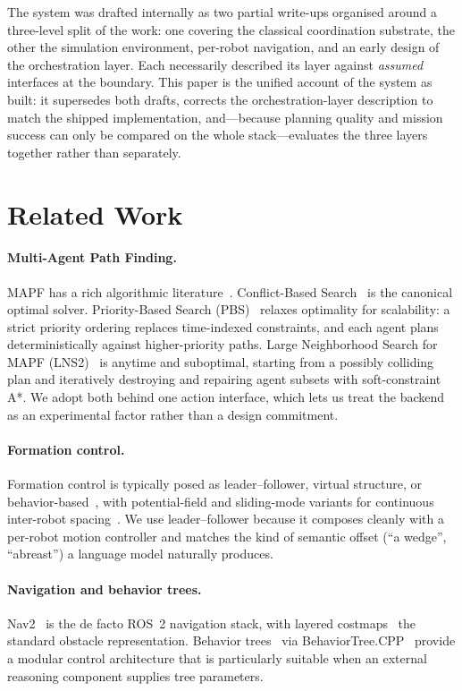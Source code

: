 \documentclass[10pt,twocolumn]{article}
\begin{document}
The system was drafted internally as two partial write-ups organised around a
three-level split of the work: one covering the classical coordination
substrate, the other the simulation environment, per-robot navigation, and an
early design of the orchestration layer. Each necessarily described its layer
against \emph{assumed} interfaces at the boundary. This paper is the unified
account of the system as built: it supersedes both drafts, corrects the
orchestration-layer description to match the shipped implementation,
and---because planning quality and mission success can only be compared on the
whole stack---evaluates the three layers together rather than separately.

\section{Related Work}

\paragraph{Multi-Agent Path Finding.}
MAPF has a rich algorithmic literature~\cite{stern}. Conflict-Based
Search~\cite{cbs} is the canonical optimal solver. Priority-Based Search
(PBS)~\cite{pbs} relaxes optimality for scalability: a strict priority ordering
replaces time-indexed constraints, and each agent plans deterministically
against higher-priority paths. Large Neighborhood Search for MAPF
(LNS2)~\cite{lns2} is anytime and suboptimal, starting from a possibly
colliding plan and iteratively destroying and repairing agent subsets with
soft-constraint A*. We adopt both behind one action interface, which lets us
treat the backend as an experimental factor rather than a design commitment.

\paragraph{Formation control.}
Formation control is typically posed as leader--follower, virtual structure, or
behavior-based~\cite{formsurvey1,formsurvey2}, with potential-field and
sliding-mode variants for continuous inter-robot spacing~\cite{apf}. We use
leader--follower because it composes cleanly with a per-robot motion controller
and matches the kind of semantic offset (``a wedge'', ``abreast'') a language
model naturally produces.

\paragraph{Navigation and behavior trees.}
Nav2~\cite{nav2} is the de facto ROS~2 navigation stack, with layered
costmaps~\cite{layered} the standard obstacle representation. Behavior
trees~\cite{btbook,btsurvey} via BehaviorTree.CPP~\cite{btcpp} provide a modular
control architecture that is particularly suitable when an external reasoning
component supplies tree parameters.
\end{document}
